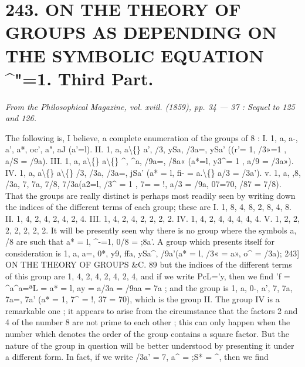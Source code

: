 \documentclass[11pt,a4paper]{book}
\begin{document}
\section*{243. ON    THE    THEORY    OF    GROUPS    AS    DEPENDING    ON    THE SYMBOLIC    EQUATION    ^"=1.     Third  Part.}
\begin{flushright}
\textit{From  the  Philosophical  Magazine,  vol.  xviil.  (1859),  pp.  34 — 37 :  Sequel  to  125  and  126.}\n\end{flushright}
\vspace{0.5em}
The  following  is,   I   believe,   a  complete   enumeration   of  the   groups   of  8 :
I.  1,  a,  a-,  a',  a*,  oc',     a",     aJ     (a'=l).
II.  1,  a,  a\textbackslash\{\}  a',  /3,  ySa,  /3a=,  ySa'  ((r'=  1,  /3»=1  ,  a/S  =  /9a).
III.  1,  a,  a\textbackslash\{\}  a\textbackslash\{\}  ^,  ^a,  /9a=,  /8a«  (a*=l,  y3^=  1  ,  a/9  =  /3a»).
IV.  1,  a,  a\textbackslash\{\}  a\textbackslash\{\}  /3,  /3a,  /3a=,  jSa'  (a*  =  l,  fi-  =  a.\textbackslash\{\}  a/3  = /3a').
v.      1,  a,  ,8,  /3a,  7,  7a,  7/8,  7/3a(a2=l,  /3^  =  1  ,    7=  =  !,  a/3  = /9a,  07=70,  /87  =  7/8).
That   the   groups   are   really   distinct   is  perhaps  most   readily  seen  by  writing  down
the  indices  of  the  different  terms  of  each  group;   these  are
I.  1,  8,  4,  8,  2,  8,  4,  8.
II.  1,  4,  2,  4,  2,  4,  2,  4.
III.  1,  4,  2,  4,  2,  2,  2,  2.
IV.  1,  4,  2,  4,  4,  4,  4,  4.
V.  1,  2,  2,  2,  2,  2,  2,  2.
It  will   be  presently  seen  why  there  is   no   group   where   the  symbols   a,  /8  are  such
that  a*  =  l,  ^-=1,  0/8  =  ;8a'.     A   group   which   presents   itself  for  consideration   is
1,  a,  a=,  0*,  y9,  ffa,  ySa^,  /9a'(a*  =  l,  /3«  =  a»,  o^  =  /3a);
243]  ON  THE  THEORY  OF  GROUPS  \&C.  89
but  the  indices  of  the  different  terms  of  this  group  are
1,  4,  2,  4,  2,  4,  2,  4,
and  if  we  write  PcL='y,  then  we  find  'f  =  ^a^a=^^aaL  =  a*  =  l,  ay  =  a/3a  = /9aa  =  7a ;
and   the  group   is
1,  a,  0-,  a',  7,  7a,  7a=,  7a' (a*  =  1,  7^  =  !,  37  =  70),
which   is   the  group   II.
The  group  IV  is  a  remarkable  one ;  it  appears  to  arise  from  the  circumstance
that  the  factors  2  and  4  of  the  number  8  are  not  prime  to  each  other ;  this  can  only
happen  when  the  number  which  denotes  the  order  of  the  group  contains  a  square
factor.  But  the  nature  of  the  group  in  question  will  be  better  understood  by  presenting
it  under  a  different  form.  In  fact,  if  we  write  /3a'  =  7,  a^  =  ;S*  =  ^,  then  we  find
\end{document}

